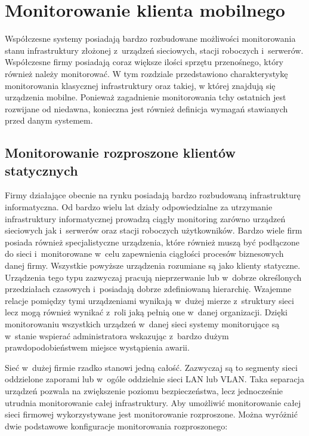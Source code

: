 \chapter{Monitorowanie klienta mobilnego}
\label{chap:Wymagania}

Współczesne systemy posiadają bardzo rozbudowane możliwości
monitorowania stanu infrastruktury złożonej z~urządzeń sieciowych,
stacji roboczych i~serwerów. Współczesne firmy posiadają coraz większe
ilości sprzętu przenośnego, który również należy monitorować. W tym
rozdziale przedstawiono charakterystykę monitorowania klasycznej
infrastruktury oraz takiej, w której znajdują się urządzenia
mobilne. Ponieważ zagadnienie monitorowania tchy ostatnich jest
rozwijane od niedawna, konieczna jest również definicja wymagań
stawianych przed danym systemem.

\section[Monitorowanie rozproszone][Monitorowanie rozproszone klientów
statycznych]{Monitorowanie rozproszone klientów statycznych}

Firmy działające obecnie na rynku posiadają bardzo rozbudowaną
infrastrukturę informatyczna. Od bardzo wielu lat działy odpowiedzialne
za utrzymanie infrastruktury informatycznej prowadzą ciągły monitoring
zarówno urządzeń sieciowych jak i~serwerów oraz stacji roboczych
użytkowników. Bardzo wiele firm posiada również specjalistyczne
urządzenia, które również muszą być podłączone do sieci i~monitorowane
w~celu zapewnienia ciągłości procesów biznesowych danej
firmy. Wszystkie powyższe urządzenia rozumiane są jako klienty
statyczne. Urządzenia tego typu zazwyczaj pracują nieprzerwanie lub
w~dobrze określonych przedziałach czasowych i~posiadają dobrze
zdefiniowaną hierarchię. Wzajemne relacje pomiędzy tymi urządzeniami
wynikają w~dużej mierze z~struktury sieci lecz mogą również wynikać
z~roli jaką pełnią one w~danej organizacji. Dzięki monitorowaniu
wszystkich urządzeń w~danej sieci systemy monitorujące są w~stanie
wspierać administratora wskazując z~bardzo dużym prawdopodobieństwem
miejsce wystąpienia awarii.

Sieć w~dużej firmie rzadko stanowi jedną całość. Zazwyczaj są to
segmenty sieci oddzielone zaporami lub w~ogóle oddzielnie sieci LAN
lub VLAN. Taka separacja urządzeń pozwala na zwiększenie poziomu
bezpieczeństwa, lecz jednocześnie utrudnia monitorowanie całej
infrastruktury. Aby umożliwić monitorowanie całej sieci firmowej
wykorzystywane jest monitorowanie rozproszone. Można wyróżnić dwie
podstawowe konfiguracje monitorowania rozproszonego:

